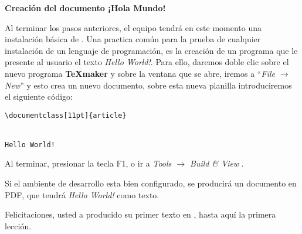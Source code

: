 \textbf{Creación del documento ¡Hola Mundo!}

Al terminar los pasos anteriores, el equipo tendrá en este momento una instalación básica de \LaTeXe. Una practica común para la prueba de cualquier instalación de un lenguaje de programación, es la creación de un programa que le presente al usuario el texto \emph{Hello World!}. Para ello, daremos doble clic sobre el nuevo programa \textbf{\TeX maker} y sobre la ventana que se abre, iremos a ``\emph{File $ \rightarrow $ New}'' y esto crea un nuevo documento, sobre esta nueva planilla introduciremos el siguiente código:


\begin{lstlisting}
\documentclass[11pt]{article} 


Hello World!

\end{lstlisting}

Al terminar, presionar la tecla F1, o ir a \emph{Tools $\rightarrow$ Build \& View }. 

Si el ambiente de desarrollo esta bien configurado, se  producirá un documento en PDF, que tendrá \emph{Hello World!} como texto.

Felicitaciones, usted a producido su primer texto en \LaTeXe{}, hasta aquí la primera lección. 